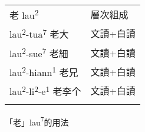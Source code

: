 \tabletail{}
\tablelasttail{}
\begin{tabularx}{\textwidth}{XX}
\lsptoprule

{\sffamily \textrm{老 lau}\textrm{\textsuperscript{2}}} & 層次組成\\
{\sffamily \textrm{lau}\textrm{\textsuperscript{2}}\textrm{{}-tua}\textrm{\textsuperscript{7}} \textrm{老大}} & 文讀+白讀\\
{\sffamily \textrm{lau}\textrm{\textsuperscript{2}}\textrm{{}-sue}\textrm{\textsuperscript{7}} \textrm{老細}} & 文讀+白讀\\
{\sffamily \textrm{lau}\textrm{\textsuperscript{2}}\textrm{{}-hiann}\textrm{\textsuperscript{1}} \textrm{老兄}} & 文讀+白讀\\
{\sffamily \textrm{lau}\textrm{\textsuperscript{2}}\textrm{{}-li}\textrm{\textsuperscript{2}}\textrm{{}-e}\textrm{\textsuperscript{1}} \textrm{老李个}} & 文讀+白讀\\
\lspbottomrule
\end{tabularx}
 \textrm{「老」lau}\textrm{\textsuperscript{7}}的用法

\tablefirsthead{}

